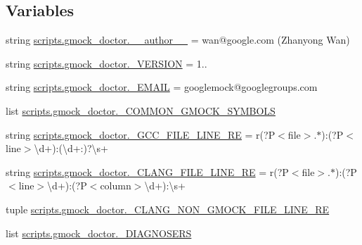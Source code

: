 \subsection*{Variables}
\begin{DoxyCompactItemize}
\item 
string \mbox{\hyperlink{namespacescripts_1_1gmock__doctor_a62ff35b79fcdc5bb65666d61573e540c}{scripts.\+gmock\+\_\+doctor.\+\_\+\+\_\+author\+\_\+\+\_\+}} = \textquotesingle{}wan@google.\+com (Zhanyong Wan)\textquotesingle{}
\item 
string \mbox{\hyperlink{namespacescripts_1_1gmock__doctor_aa4f1535d4db167d9163f7245ccc35e26}{scripts.\+gmock\+\_\+doctor.\+\_\+\+V\+E\+R\+S\+I\+ON}} = \textquotesingle{}1..\textquotesingle{}
\item 
string \mbox{\hyperlink{namespacescripts_1_1gmock__doctor_af1fbc3517760f89ea7e5daeee9dbaabb}{scripts.\+gmock\+\_\+doctor.\+\_\+\+E\+M\+A\+IL}} = \textquotesingle{}googlemock@googlegroups.\+com\textquotesingle{}
\item 
list \mbox{\hyperlink{namespacescripts_1_1gmock__doctor_a76bcb3f48669600b95cdfd35d7d4a172}{scripts.\+gmock\+\_\+doctor.\+\_\+\+C\+O\+M\+M\+O\+N\+\_\+\+G\+M\+O\+C\+K\+\_\+\+S\+Y\+M\+B\+O\+LS}}
\item 
string \mbox{\hyperlink{namespacescripts_1_1gmock__doctor_a7d70a5e2921b5b294a55e39857963ed1}{scripts.\+gmock\+\_\+doctor.\+\_\+\+G\+C\+C\+\_\+\+F\+I\+L\+E\+\_\+\+L\+I\+N\+E\+\_\+\+RE}} = r\textquotesingle{}(?P$<$file$>$.$\ast$)\+:(?P$<$line$>$\textbackslash{}d+)\+:(\textbackslash{}d+\+:)?\textbackslash{}s+\textquotesingle{}
\item 
string \mbox{\hyperlink{namespacescripts_1_1gmock__doctor_a909f5d793ae7a74df3075760b0289451}{scripts.\+gmock\+\_\+doctor.\+\_\+\+C\+L\+A\+N\+G\+\_\+\+F\+I\+L\+E\+\_\+\+L\+I\+N\+E\+\_\+\+RE}} = r\textquotesingle{}(?P$<$file$>$.$\ast$)\+:(?P$<$line$>$\textbackslash{}d+)\+:(?P$<$column$>$\textbackslash{}d+)\+:\textbackslash{}s+\textquotesingle{}
\item 
tuple \mbox{\hyperlink{namespacescripts_1_1gmock__doctor_ab6245dbb3292d0fd333956d01a909b7d}{scripts.\+gmock\+\_\+doctor.\+\_\+\+C\+L\+A\+N\+G\+\_\+\+N\+O\+N\+\_\+\+G\+M\+O\+C\+K\+\_\+\+F\+I\+L\+E\+\_\+\+L\+I\+N\+E\+\_\+\+RE}}
\item 
list \mbox{\hyperlink{namespacescripts_1_1gmock__doctor_a275031d52a2133eb194f7d04df2730a6}{scripts.\+gmock\+\_\+doctor.\+\_\+\+D\+I\+A\+G\+N\+O\+S\+E\+RS}}
\end{DoxyCompactItemize}
